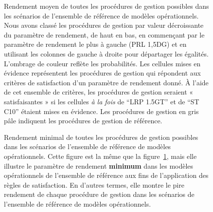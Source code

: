 \documentclass[11pt]{book}
\begin{document}
\begin{figure}[htb]

{\centering {} 

}

\caption{Rendement moyen de toutes les procédures de gestion possibles dans les scénarios de l'ensemble de référence de modèles opérationnels. Nous avons classé les procédures de gestion par valeur décroissante du paramètre de rendement, de haut en bas, en commençant par le paramètre de rendement le plus à gauche (PRL 1,5DG) et en utilisant les colonnes de gauche à droite pour départager les égalités. L'ombrage de couleur reflète les probabilités. Les cellules mises en évidence représentent les procédures de gestion qui répondent aux critères de satisfaction d'un paramètre de rendement donné. À l'aide de cet ensemble de critères, les procédures de gestion seraient « satisfaisantes » si les cellules \emph{à la fois} de ``LRP 1.5GT'' et de ``ST C10'' étaient mises en évidence. Les procédures de gestion en gris pâle indiquent les procédures de gestion de référence.}\label{fig:tigure-avg}
\end{figure}

\begin{figure}[htb]

{\centering {} 

}

\caption{Rendement minimal de toutes les procédures de gestion possibles dans les scénarios de l'ensemble de référence de modèles opérationnels. Cette figure est la même que la figure~\ref{fig:tigure-avg}, mais elle illustre le paramètre de rendement \textbf{minimum} dans les modèles opérationnels de l'ensemble de référence aux fins de l'application des règles de satisfaction. En d'autres termes, elle montre le pire rendement de chaque procédure de gestion dans les scénarios de l'ensemble de référence de modèles opérationnels.}\label{fig:tigure-min}
\end{figure}
\clearpage
\end{document}
